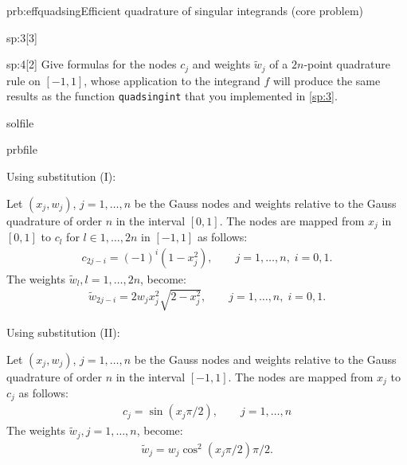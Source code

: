 \begin{samproblem}{prb:effquadsing}{Efficient quadrature of singular integrands (core problem)}
\begin{subproblem}{sp:3}[3]
\end{subproblem}


\begin{subproblem}{sp:4}[2]
  Give formulas for the nodes $c_j$ and weights $\tilde{w}_j$ of a $2n$-point quadrature rule on $[-1,1]$, 
  whose application to the integrand $f$ will produce the same results as the function \verb|quadsingint| that you implemented in \ref{sp:3}.
  
  \begin{samwriteprbpart}{solfile}
    \begin{writeverbatim}{prbfile}
      \begin{samsolution}
        Using substitution (I):
         
        Let $(x_j, w_j)$, $j=1,\dots,n$ be the Gauss nodes and weights relative to the Gauss quadrature of order $n$ in the interval $[0,1]$. 
        The nodes are mapped from $x_j$ in $[0,1]$ to $c_l$ for $l \in 1,\dots,2n$ in $[-1,1]$ as follows:
        \begin{align*}
          c_{2j-i}  = (-1)^i (1-x_j^2),\qquad j=1,\dots,n,\;i=0,1.  
        \end{align*}
        The weights $\tilde{w}_{l}, l = 1,\dots,2n$, become:
        \begin{align*}
          \tilde{w}_{2j-i} = 2 w_j x_j^2 \sqrt{2 - x_j^2},\qquad j=1,\dots,n,\;i=0,1.
        \end{align*}
    
        Using substitution (II):

        Let $(x_j, w_j)$, $j=1,\dots,n$ be the Gauss nodes and weights relative to the Gauss quadrature of order $n$ in the interval $[-1,1]$.  
        The nodes are mapped from $x_j$ to $c_j$  as follows:
        \begin{align*}
          c_j = \sin(x_j  \pi / 2),\qquad j=1,\dots,n
        \end{align*}
        The weights $\tilde{w}_{j}, j = 1,\dots,n$, become:
        \begin{align*}
          \tilde{w}_{j} = w_j \cos^2(x_j  \pi / 2) \pi / 2.
        \end{align*}
      \end{samsolution}
    \end{writeverbatim}
  \end{samwriteprbpart}
\end{subproblem}




\end{samproblem}
